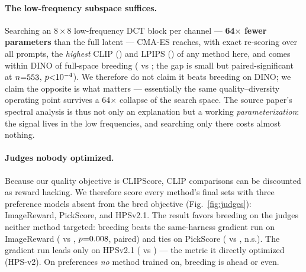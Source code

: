 \documentclass[10pt,twocolumn,letterpaper]{article}
\begin{document}
\ifdefined\nbCmadctDino
\paragraph{The low-frequency subspace suffices.} Searching an $8{\times}8$
low-frequency DCT block per channel --- \textbf{64$\times$ fewer parameters}
than the full latent --- CMA-ES reaches, with exact re-scoring over all
\nbNumPrompts{} prompts, the \emph{highest} CLIP (\nbCmadctClip) and LPIPS
(\nbCmadctLpips) of any method here, and comes within
\nbStatCmadctDinoDiff{} DINO of full-space breeding (\nbCmadctDino{} vs
\nbBredDino; the gap is small but paired-significant at $n{=}553$,
$p{<}10^{-4}$). We therefore do not claim it beats breeding on DINO;
we claim the opposite is what matters --- essentially the same
quality--diversity operating point survives a 64$\times$ collapse of the
search space. The source paper's spectral analysis is thus not only an
explanation but a working \emph{parameterization}: the signal lives in the
low frequencies, and searching only there costs almost nothing.
\fi

\ifdefined\nbJudgeBredImagereward
\paragraph{Judges nobody optimized.} Because our quality objective is
CLIPScore, CLIP comparisons can be discounted as reward hacking. We therefore
score every method's final sets with three preference models absent from the
bred objective (Fig.~\ref{fig:judges}): ImageReward, PickScore, and HPSv2.1.
The result favors breeding on the judges neither method targeted: breeding
beats the same-harness gradient run on ImageReward
(\nbJudgeBredImagereward{} vs \nbJudgeGradImagereward,
$p{=}0.008$, paired) and ties on PickScore
(\nbJudgeBredPickscore{} vs \nbJudgeGradPickscore, n.s.). The gradient run
leads only on HPSv2.1 (\nbJudgeGradHpsv{} vs \nbJudgeBredHpsv) --- the metric
it directly optimized (HPS-v2). On preferences \emph{no} method trained on,
breeding is ahead or even.
\fi
\end{document}
